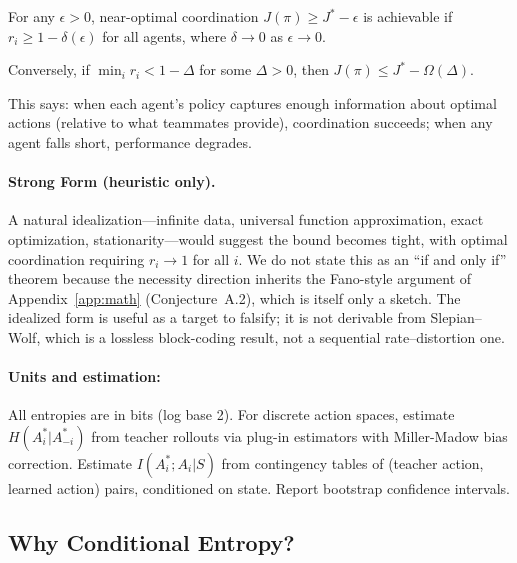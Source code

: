 \documentclass[10pt, letterpaper]{article}
\begin{document}
For any $\epsilon > 0$, near-optimal coordination $J(\pi) \geq J^* - \epsilon$ is achievable if $r_i \geq 1 - \delta(\epsilon)$ for all agents, where $\delta \to 0$ as $\epsilon \to 0$.

Conversely, if $\min_i r_i < 1 - \Delta$ for some $\Delta > 0$, then $J(\pi) \leq J^* - \Omega(\Delta)$.

\bigskip

This says: when each agent's policy captures enough information about optimal actions (relative to what teammates provide), coordination succeeds; when any agent falls short, performance degrades.

\paragraph{Strong Form (heuristic only).} A natural idealization---infinite data, universal function approximation, exact optimization, stationarity---would suggest the bound becomes tight, with optimal coordination requiring $r_i \to 1$ for all $i$. We do not state this as an ``if and only if'' theorem because the necessity direction inherits the Fano-style argument of Appendix~\ref{app:math} (Conjecture~A.2), which is itself only a sketch. The idealized form is useful as a target to falsify; it is not derivable from Slepian--Wolf, which is a lossless block-coding result, not a sequential rate--distortion one.

\paragraph{Units and estimation:} All entropies are in bits (log base 2). For discrete action spaces, estimate $H(A_i^*|A_{-i}^*)$ from teacher rollouts via plug-in estimators with Miller-Madow bias correction. Estimate $I(A_i^*; A_i|S)$ from contingency tables of (teacher action, learned action) pairs, conditioned on state. Report bootstrap confidence intervals.

\subsection{Why Conditional Entropy?}
\end{document}
